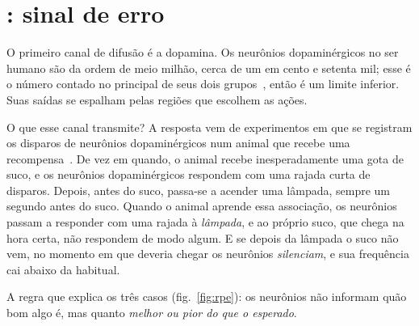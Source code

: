 \section{: sinal de erro}

O primeiro canal de difusão é a dopamina. Os neurônios dopaminérgicos no ser humano são da ordem de meio milhão, cerca de um em cento e setenta mil; esse é o número contado no principal de seus dois grupos~\cite{Pakkenberg1991}, então é um limite inferior. Suas saídas se espalham pelas regiões que escolhem as ações.

O que esse canal transmite? A resposta vem de experimentos em que se registram os disparos de neurônios dopaminérgicos num animal que recebe uma recompensa~\cite{Schultz1997}. De vez em quando, o animal recebe inesperadamente uma gota de suco, e os neurônios dopaminérgicos respondem com uma rajada curta de disparos. Depois, antes do suco, passa-se a acender uma lâmpada, sempre um segundo antes do suco. Quando o animal aprende essa associação, os neurônios passam a responder com uma rajada à \emph{lâmpada}, e ao próprio suco, que chega na hora certa, não respondem de modo algum. E se depois da lâmpada o suco não vem, no momento em que deveria chegar os neurônios \emph{silenciam}, e sua frequência cai abaixo da habitual.

A regra que explica os três casos (fig.~\ref{fig:rpe}): os neurônios não informam quão bom algo é, mas quanto \emph{melhor ou pior do que o esperado}.

